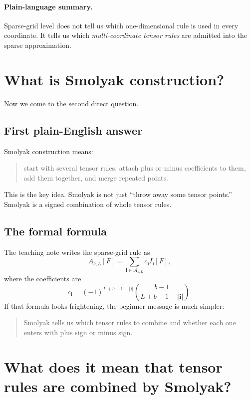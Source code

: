 \documentclass[11pt]{article}
\begin{document}
\paragraph{Plain-language summary.}
Sparse-grid level does not tell us which one-dimensional rule is used in every
coordinate.  It tells us which \emph{multi-coordinate tensor rules} are admitted
into the sparse approximation.

\section{What is Smolyak construction?}
\label{sec:what-is-smolyak}

Now we come to the second direct question.

\subsection{First plain-English answer}

Smolyak construction means:
\begin{quote}
start with several tensor rules, attach plus or minus coefficients to them, add
them together, and merge repeated points.
\end{quote}

This is the key idea.  Smolyak is not just ``throw away some tensor points.''
Smolyak is a signed combination of whole tensor rules.

\subsection{The formal formula}

The teaching note writes the sparse-grid rule as
\begin{equation}
  A_{b,L}[F]
  =
  \sum_{\mathbf i\in\mathcal A_{b,L}} c_{\mathbf i} I_{\mathbf i}[F],
  \label{eq:smolyak-formula}
\end{equation}
where the coefficients are
\begin{equation}
  c_{\mathbf i}
  =
  (-1)^{L+b-1-|\mathbf i|}
  \binom{b-1}{L+b-1-|\mathbf i|}.
  \label{eq:smolyak-coefficients}
\end{equation}
If that formula looks frightening, the beginner message is much simpler:
\begin{quote}
Smolyak tells us which tensor rules to combine and whether each one enters with
plus sign or minus sign.
\end{quote}

\section{What does it mean that tensor rules are combined by Smolyak?}
\label{sec:combined-by-smolyak}
\end{document}
